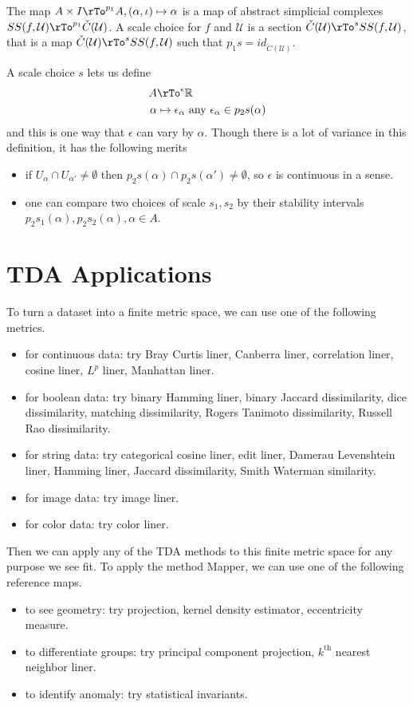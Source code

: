 \documentclass[12pt]{amsart}
\theoremstyle{definition}
\begin{document}
The map $A \times I \rTo^{p_1} A, (\alpha, \iota) \mapsto \alpha$ is a map of abstract simplicial complexes $SS(f, \mathcal{U}) \rTo^{p_1} \check{C}(\mathcal{U})$.
\dfn A scale choice for $f$ and $\mathcal{U}$ is a section $\check{C}(\mathcal{U}) \rTo^s SS(f, \mathcal{U})$, that is a map $\check{C}(\mathcal{U}) \rTo^s SS(f, \mathcal{U})$ such that $p_1s = id_{\check{C}(\mathcal{U})}$.

A scale choice $s$ lets us define
\begin{align*}
A & \rTo^{\epsilon} \mathbb{R} \\
\alpha & \mapsto \epsilon_{\alpha} \text{ any } \epsilon_{\alpha} \in p_2s(\alpha)
\end{align*}
and this is one way that $\epsilon$ can vary by $\alpha$. Though there is a lot of variance in this definition, it has the following merits
\begin{itemize}
\item if $U_{\alpha} \cap U_{\alpha'} \neq \emptyset$ then $p_2s(\alpha) \cap p_2s(\alpha') \neq \emptyset$, so $\epsilon$ is continuous in a sense.
\item one can compare two choices of scale $s_1, s_2$ by their stability intervals $p_2s_1(\alpha), p_2s_2(\alpha), \alpha \in A$.
\end{itemize}

\section{TDA Applications} To turn a dataset into a finite metric space, we can use one of the following metrics.
\begin{itemize}
\item for continuous data: try Bray Curtis liner, Canberra liner, correlation liner, cosine liner, $L^p$ liner, Manhattan liner.
\item for boolean data: try binary Hamming liner, binary Jaccard dissimilarity, dice dissimilarity, matching dissimilarity, Rogers Tanimoto dissimilarity, Russell Rao dissimilarity.
\item for string data: try categorical cosine liner, edit liner, Damerau Levenshtein liner, Hamming liner, Jaccard dissimilarity, Smith Waterman similarity.
\item for image data: try image liner.
\item for color data: try color liner.
\end{itemize}

Then we can apply any of the TDA methods to this finite metric space for any purpose we see fit. To apply the method Mapper, we can use one of the following reference maps.
\begin{itemize}
\item to see geometry: try projection, kernel density estimator, eccentricity measure.
\item to differentiate groups: try principal component projection, $k^{\text{th}}$ nearest neighbor liner.
\item to identify anomaly: try statistical invariants.
\end{itemize}
\end{document}
